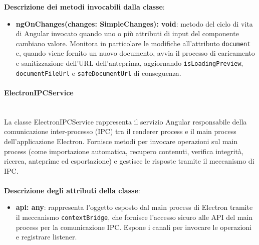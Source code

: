 \documentclass[a4paper,12pt]{article}
\begin{document}
{{{{                \noindent \textbf{Descrizione dei metodi invocabili dalla classe}:
                \begin{itemize}
                    \item \textbf{ngOnChanges(changes: SimpleChanges): void}: metodo del ciclo di vita di Angular invocato quando uno o più attributi di input del componente cambiano valore. Monitora in particolare le modifiche all'attributo \texttt{document} e, quando viene fornito un nuovo documento, avvia il processo di caricamento e sanitizzazione dell'URL dell'anteprima, aggiornando \texttt{isLoadingPreview}, \texttt{documentFileUrl} e \texttt{safeDocumentUrl} di conseguenza.
                \end{itemize}
                \paragraph{ElectronIPCService}\label{par:ElectronIPCService}\mbox{}\\
                La classe ElectronIPCService rappresenta il servizio Angular responsabile della comunicazione inter-processo (IPC) tra il renderer process e il main process dell'applicazione Electron. Fornisce metodi per invocare operazioni sul main process (come importazione automatica, recupero contenuti, verifica integrità, ricerca, anteprime ed esportazione) e gestisce le risposte tramite il meccanismo di IPC.\\
                \\
                \textbf{Descrizione degli attributi della classe}:
                \begin{itemize}
                    \item \textbf{api: any}: rappresenta l'oggetto esposto dal main process di Electron tramite il meccanismo \texttt{contextBridge}, che fornisce l'accesso sicuro alle API del main process per la comunicazione IPC. Espone i canali per invocare le operazioni e registrare listener.
                \end{itemize}
                
}}}}
\end{document}
